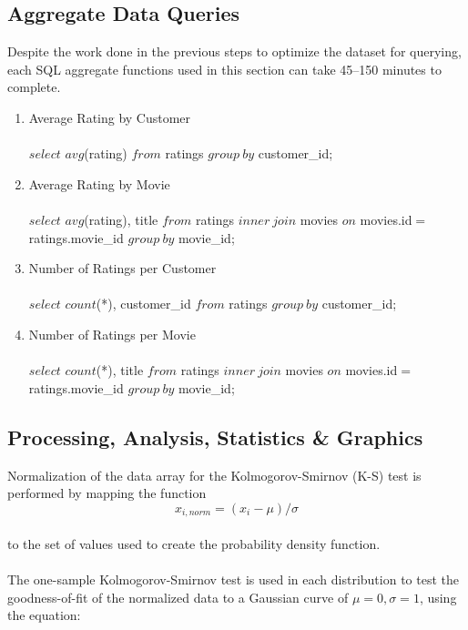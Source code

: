 \documentclass{acmtog}
\begin{document}
\subsection{Aggregate Data Queries}

Despite the work done in the previous steps to optimize the dataset for querying, each SQL aggregate functions used in this section can take 45--150 minutes to complete.
\begin{enumerate}
	\item Average Rating by Customer \\ \\
		$select$ $avg$(rating) $from$ ratings $group\ by$ customer\_id;
		\\

	\item Average Rating by Movie \\ \\
		$select$ $avg$(rating), title $from$ ratings $inner\ join$ movies $on$ movies.id$=$ratings.movie\_id $group\ by$ movie\_id;
		\\

	\item Number of Ratings per Customer \\ \\
		$select$ $count$(*), customer\_id $from$ ratings $group\ by$ customer\_id;
		\\

	\item Number of Ratings per Movie \\ \\
		$select$ $count$(*), title $from$ ratings $inner\ join$ movies $on$ movies.id$=$ ratings.movie\_id $group\ by$ movie\_id;
		\\

\end{enumerate}

\subsection{Processing, Analysis, Statistics \& Graphics}
Normalization of the data array for the Kolmogorov-Smirnov (K-S) test is performed by mapping the function
\begin{equation}
x_{i,norm}=(x_i-\mu)/\sigma
\end{equation}
\\to the set of values used to create the probability density function.
\\
\\
The one-sample Kolmogorov-Smirnov test is used in each distribution to test the goodness-of-fit of the normalized data to a Gaussian curve of $\mu=0, \sigma=1$, using the equation:
\end{document}
